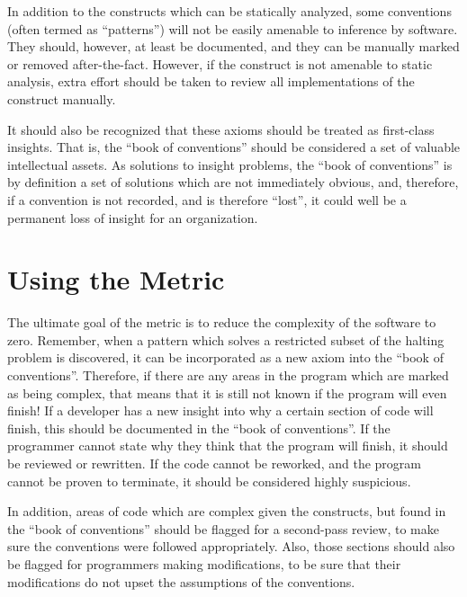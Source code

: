 In addition to the constructs which can be statically analyzed, some conventions (often termed as ``patterns'') will not be easily amenable to inference by software.  They should, however, at least be documented, and they can be manually marked or removed after-the-fact.  However, if the construct is not amenable to static analysis, extra effort should be taken to review all implementations of the construct manually.

It should also be recognized that these axioms should be treated as first-class insights.  That is, the ``book of conventions'' should be considered a set of valuable intellectual assets.  As solutions to insight problems, the ``book of conventions'' is by definition a set of solutions which are not immediately obvious, and, therefore, if a convention is not recorded, and is therefore ``lost'', it could well be a permanent loss of insight for an organization.


\section{Using the Metric}

The ultimate goal of the metric is to reduce the complexity of the software to zero.  Remember, when a pattern which solves a restricted subset of the halting problem is discovered, it can be incorporated as a new axiom into the ``book of conventions''.  Therefore, if there are any areas in the program which are marked as being complex, that means that it is still not known if the program will even finish!  If a developer has a new insight into why a certain section of code will finish, this should be documented in the ``book of conventions''.  If the programmer cannot state why they think that the program will finish, it should be reviewed or rewritten.  If the code cannot be reworked, and the program cannot be proven to terminate, it should be considered highly suspicious.

In addition, areas of code which are complex given the constructs, but found in the ``book of conventions'' should be flagged for a second-pass review, to make sure the conventions were followed appropriately.  Also, those sections should also be flagged for programmers making modifications, to be sure that their modifications do not upset the assumptions of the conventions.

